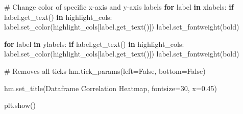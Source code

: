 \documentclass[
  letterpaper,
  DIV=11,
  numbers=noendperiod]{scrartcl}
\newenvironment{Shaded}{\begin{snugshade}}{\end{snugshade}}
\newcommand{\CommentTok}[1]{\textcolor[rgb]{0.37,0.37,0.37}{#1}}
\newcommand{\ControlFlowTok}[1]{\textcolor[rgb]{0.00,0.23,0.31}{\textbf{#1}}}
\newcommand{\DecValTok}[1]{\textcolor[rgb]{0.68,0.00,0.00}{#1}}
\newcommand{\FloatTok}[1]{\textcolor[rgb]{0.68,0.00,0.00}{#1}}
\newcommand{\KeywordTok}[1]{\textcolor[rgb]{0.00,0.23,0.31}{\textbf{#1}}}
\newcommand{\NormalTok}[1]{\textcolor[rgb]{0.00,0.23,0.31}{#1}}
\newcommand{\OperatorTok}[1]{\textcolor[rgb]{0.37,0.37,0.37}{#1}}
\newcommand{\StringTok}[1]{\textcolor[rgb]{0.13,0.47,0.30}{#1}}
\newcommand{\VariableTok}[1]{\textcolor[rgb]{0.07,0.07,0.07}{#1}}
\begin{document}
\begin{Shaded}
\begin{Highlighting}[]
\CommentTok{\# Change color of specific x{-}axis and y{-}axis labels}
\ControlFlowTok{for}\NormalTok{ label }\KeywordTok{in}\NormalTok{ xlabels:}
    \ControlFlowTok{if}\NormalTok{ label.get\_text() }\KeywordTok{in}\NormalTok{ highlight\_cols:}
\NormalTok{        label.set\_color(highlight\_cols[label.get\_text()])}
\NormalTok{        label.set\_fontweight(}\StringTok{\textquotesingle{}bold\textquotesingle{}}\NormalTok{)}

\ControlFlowTok{for}\NormalTok{ label }\KeywordTok{in}\NormalTok{ ylabels:}
    \ControlFlowTok{if}\NormalTok{ label.get\_text() }\KeywordTok{in}\NormalTok{ highlight\_cols:}
\NormalTok{        label.set\_color(highlight\_cols[label.get\_text()])}
\NormalTok{        label.set\_fontweight(}\StringTok{\textquotesingle{}bold\textquotesingle{}}\NormalTok{)}

\CommentTok{\# Removes all ticks}
\NormalTok{hm.tick\_params(left}\OperatorTok{=}\VariableTok{False}\NormalTok{, bottom}\OperatorTok{=}\VariableTok{False}\NormalTok{)}

\NormalTok{hm.set\_title(}\StringTok{\textquotesingle{}Dataframe Correlation Heatmap\textquotesingle{}}\NormalTok{, fontsize}\OperatorTok{=}\DecValTok{30}\NormalTok{, x}\OperatorTok{=}\FloatTok{0.45}\NormalTok{)}

\NormalTok{plt.show()}
\end{Highlighting}
\end{Shaded}
\end{document}

